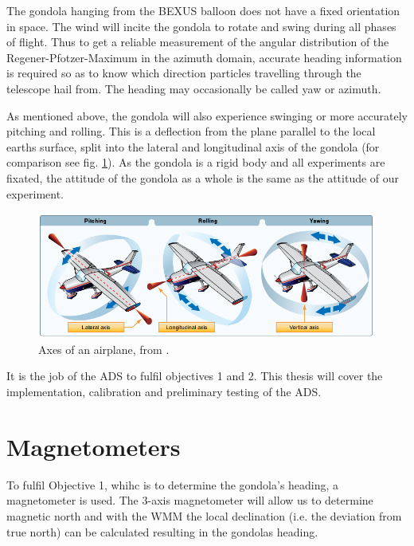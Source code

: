 The gondola hanging from the \ac{BEXUS} balloon does not have a fixed orientation in space. The wind will incite the gondola to rotate and swing during all phases of flight. Thus to get a reliable measurement of the angular distribution of the Regener-Pfotzer-Maximum in the azimuth domain, accurate heading information is required so as to know which direction particles travelling through the telescope hail from. The heading may occasionally be called yaw or azimuth.


As mentioned above, the gondola will also experience swinging or more accurately pitching and rolling. This is a deflection from the plane parallel to the local earths surface, split into the lateral and longitudinal axis of the gondola (for comparison see fig. \ref{fig:attitude}). As the gondola is a rigid body and all experiments are fixated, the attitude of the gondola as a whole is the same as the attitude of our experiment.


\begin{figure}[H]
    \centering
    \includegraphics[width=0.5\linewidth]{images/01_background/axes_of_an_airplane.png}
    \caption[Axes of an airplane]{Axes of an airplane, from \cite{pilot-handbook}.}
    \label{fig:attitude}
\end{figure}

It is the job of the \ac{ADS} to fulfil objectives 1 and 2. This thesis will cover the implementation, calibration and preliminary testing of the \ac{ADS}.

\section{Magnetometers \label{sec:bg:magnetometers}}
To fulfil Objective 1, whihc is to determine the gondola's heading, a magnetometer is used. The 3-axis magnetometer will allow us to determine magnetic north and with the \ac{WMM} the local declination (i.e. the deviation from true north) can be calculated resulting in the gondolas heading. 


